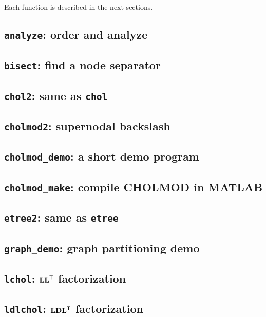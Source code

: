 \documentclass[11pt]{article}
\newcommand{\m}[1]{{\bf{#1}}}       %
\newcommand{\tr}{^{\sf T}}          %
\begin{document}
\vspace{0.1in}\noindent
Each function is described in the next sections.

\newpage
\subsection{{\tt analyze}: order and analyze}					
\subsection{{\tt bisect}: find a node separator}				
\subsection{{\tt chol2}: same as {\tt chol}}					
\newpage
\subsection{{\tt cholmod2}: supernodal backslash}				
\newpage
\subsection{{\tt cholmod\_demo}: a short demo program}				
\subsection{{\tt cholmod\_make}: compile CHOLMOD in MATLAB}			
\newpage
\subsection{{\tt etree2}: same as {\tt etree}}					
\newpage
\subsection{{\tt graph\_demo}: graph partitioning demo}				
\newpage
\subsection{{\tt lchol}: $\m{LL}\tr$ factorization}				
\subsection{{\tt ldlchol}: $\m{LDL}\tr$ factorization}				
\newpage
\end{document}
